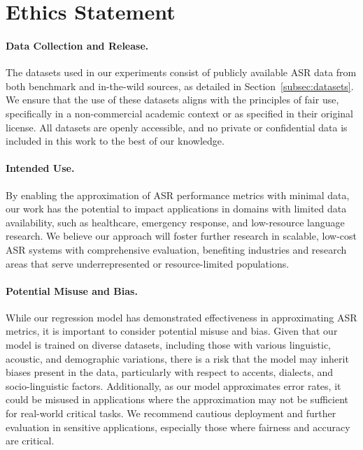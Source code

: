 \section{Ethics Statement}\label{sec:ethics_statement}

\paragraph{Data Collection and Release.} The datasets used in our experiments consist of publicly available ASR data from both benchmark and in-the-wild sources, as detailed in Section~\ref{subsec:datasets}. We ensure that the use of these datasets aligns with the principles of fair use, specifically in a non-commercial academic context or as specified in their original license. All datasets are openly accessible, and no private or confidential data is included in this work to the best of our knowledge. 

\paragraph{Intended Use.} By enabling the approximation of ASR performance metrics with minimal data, our work has the potential to impact applications in domains with limited data availability, such as healthcare, emergency response, and low-resource language research. We believe our approach will foster further research in scalable, low-cost ASR systems with comprehensive evaluation, benefiting industries and research areas that serve underrepresented or resource-limited populations.

\paragraph{Potential Misuse and Bias.} While our regression model has demonstrated effectiveness in approximating ASR metrics, it is important to consider potential misuse and bias. Given that our model is trained on diverse datasets, including those with various linguistic, acoustic, and demographic variations, there is a risk that the model may inherit biases present in the data, particularly with respect to accents, dialects, and socio-linguistic factors. Additionally, as our model approximates error rates, it could be misused in applications where the approximation may not be sufficient for real-world critical tasks. We recommend cautious deployment and further evaluation in sensitive applications, especially those where fairness and accuracy are critical. 
